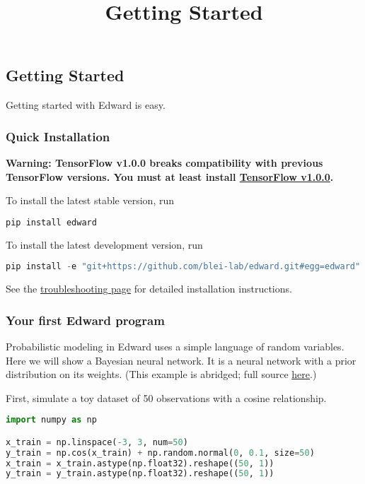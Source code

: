 \title{Getting Started}

\subsection{Getting Started}
Getting started with Edward is easy.

\subsubsection{Quick Installation}
\textbf{Warning: TensorFlow v1.0.0 breaks
compatibility with previous TensorFlow versions. You must at least install
\href{https://www.tensorflow.org/versions/r1.0/get_started/os_setup}{TensorFlow v1.0.0}.
}

To install the latest stable version, run

\begin{lstlisting}[language=Java]
pip install edward
\end{lstlisting}

To install the latest development version, run

\begin{lstlisting}[language=Java]
pip install -e "git+https://github.com/blei-lab/edward.git#egg=edward"
\end{lstlisting}

See the \href{/troubleshooting}{troubleshooting page} for detailed
installation instructions.


\subsubsection{Your first Edward program}

Probabilistic modeling in Edward uses a simple language of
random variables.
Here we will show a Bayesian neural network. It is a neural network
with a prior distribution on its weights.
(This example is abridged; full source
\href{https://github.com/blei-lab/edward/blob/master/examples/getting_started_example.py}
{here}.)

First, simulate a toy dataset of 50 observations with a cosine relationship.

\begin{lstlisting}[language=Python]
import numpy as np

x_train = np.linspace(-3, 3, num=50)
y_train = np.cos(x_train) + np.random.normal(0, 0.1, size=50)
x_train = x_train.astype(np.float32).reshape((50, 1))
y_train = y_train.astype(np.float32).reshape((50, 1))
\end{lstlisting}

